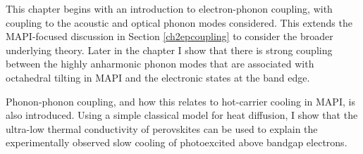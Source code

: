 This chapter begins with an introduction to electron-phonon coupling, with coupling to the acoustic and optical phonon modes considered. This extends the MAPI-focused discussion in Section \ref{ch2epcoupling} to consider the broader underlying theory. Later in the chapter I show that there is strong coupling between the highly anharmonic phonon modes that are associated with octahedral tilting in MAPI and the electronic states at the band edge. 

Phonon-phonon coupling, and how this relates to hot-carrier cooling in MAPI, is also introduced. Using a simple classical model for heat diffusion, I show that the ultra-low thermal conductivity of perovskites can be used to explain the experimentally observed slow cooling of photoexcited above bandgap electrons.


